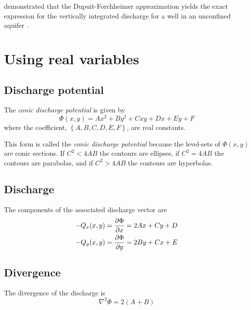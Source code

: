 \documentclass[12pt]{report}
\providecommand{\pderiv}[2]{\frac{\mathinner{\partial#1}}{\mathinner{\partial#2}}}
\begin{document}
\citet{Charnyi51} demonstrated that the Dupuit-Forchheimer approximation yields the exact expression for the vertically integrated discharge for a well in an unconfined aquifer \citep[see][p. 281]{Polubarinova62}.



\section{Using real variables}
\subsection{Discharge potential}
The {\em conic discharge potential} is given by
%
\begin{equation} \label{2.3.1}
\boxed{
    \Phi(x,y) = Ax^2 + By^2 + Cxy + Dx + Ey + F
}
\end{equation}
%
where the coefficient, $\left\{ A, B, C, D, E, F \right\}$, are real constants.

This form is called the {\em conic discharge potential} because the level-sets of $\Phi(x,y)$ are conic sections.  If $C^2 < 4AB$ the contours are ellipses, if $C^2 = 4AB$ the contours are parabolas, and if $C^2 > 4AB$ the contours are hyperbolas.

\subsection{Discharge}
The components of the associated discharge vector are
%
\begin{align}
    -Q_x(x,y) &= \pderiv{\Phi}{x} = 2Ax + Cy + D \label{2.3.2}\\
    -Q_y(x,y) &= \pderiv{\Phi}{y} = 2By + Cx + E \label{2.3.3}
\end{align}

\subsection{Divergence}
The divergence of the discharge is
%
\begin{equation}\label{2.3.4}
    \nabla^2 \Phi = 2(A+B)
\end{equation}
\end{document}

